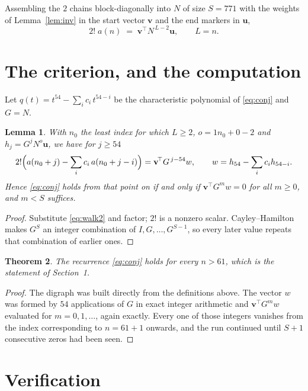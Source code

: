 \documentclass[11pt,a4paper]{article}
\theoremstyle{plain}
\newtheorem{theorem}{Theorem}
\newtheorem{lemma}[theorem]{Lemma}
\theoremstyle{definition}
\begin{document}
Assembling the $2$ chains block-diagonally into $N$ of size $S=771$ with the weights of
Lemma~\ref{lem:inv} in the start vector $\mathbf{v}$ and the end markers in
$\mathbf{u}$,
\begin{equation}\label{eq:walk2}
2!\;a(n)\;=\;\mathbf{v}^{\!\top}N^{\,L-2}\mathbf{u},\qquad L=n .
\end{equation}

\section{The criterion, and the computation}

Let $q(t)=t^{54}-\sum_i c_i\,t^{54-i}$ be the characteristic polynomial of
\eqref{eq:conj} and $G=N$.

\begin{lemma}\label{lem:crit}
With $n_0$ the least index for which $L\ge2$, $o=1n_0+0-2$ and
$h_j=G^{j}N^{o}\mathbf{u}$, we have for $j\ge54$
\[
2!\Bigl(a(n_0+j)-\sum_i c_i\,a(n_0+j-i)\Bigr)=\mathbf{v}^{\!\top}G^{\,j-54}w,
\qquad w=h_{54}-\sum_i c_i h_{54-i} .
\]
Hence \eqref{eq:conj} holds from that point on if and only if
$\mathbf{v}^{\!\top}G^{m}w=0$ for all $m\ge0$, and $m<S$ suffices.
\end{lemma}

\begin{proof}
Substitute \eqref{eq:walk2} and factor; $2!$ is a nonzero scalar. Cayley--Hamilton
makes $G^{S}$ an integer combination of $I,G,\dots,G^{S-1}$, so every later value repeats
that combination of earlier ones.
\end{proof}

\begin{theorem}
The recurrence \eqref{eq:conj} holds for every $n>61$, which is the statement of
Section~1.
\end{theorem}

\begin{proof}
The digraph was built directly from the definitions above. The vector $w$ was formed by
$54$ applications of $G$ in exact integer arithmetic and $\mathbf{v}^{\!\top}G^{m}w$
evaluated for $m=0,1,\dots$, again exactly. Every one of those integers vanishes from the
index corresponding to $n=61+1$ onwards, and the run continued until $S+1$ consecutive
zeros had been seen.
\end{proof}

\section{Verification}
\end{document}

